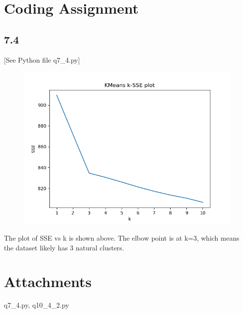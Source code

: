 \documentclass[a4paper, 11pt]{article}
\begin{document}
\newpage  
\section*{Coding Assignment}

\subsection*{7.4}

[See Python file q7\_4.py]\newline

\begin{figure}[htbp]
	\centering
	\includegraphics[scale=0.45]{kmeansSSE.png}
\end{figure}
The plot of SSE vs k is shown above. The elbow point is at k=3, which means the dataset likely has 3 natural clusters.


\section*{Attachments}

q7\_4.py, q10\_4\_2.py
\end{document}
